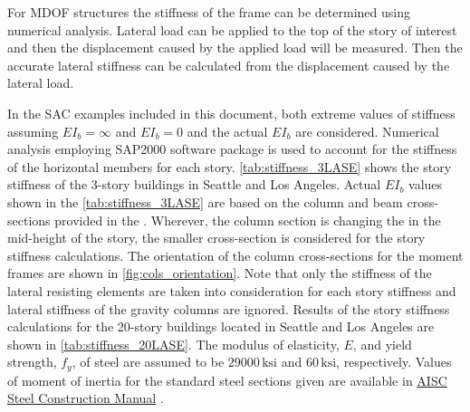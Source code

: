 \documentclass{simcenterdocumentation}
\newcommand{\ksi}{\ensuremath{\,\mathrm{ksi}}}
\begin{document}
For MDOF structures the stiffness of the frame can be determined using numerical analysis. Lateral load can be applied to the top of the story of interest and then the displacement caused by the applied load will be measured. Then the accurate lateral stiffness can be calculated from the displacement caused by the lateral load. 

In the SAC examples included in this document, both extreme values of stiffness assuming $EI_b = \infty$ and $EI_b = 0$ and the actual $EI_b$ are considered. Numerical analysis employing SAP2000 \cite{sap2000} software package is used to account for the stiffness of the horizontal members for each story. \cref{tab:stiffness_3LASE} shows the story stiffness of the 3-story buildings in Seattle and Los Angeles. Actual $EI_b$ values shown in the \cref{tab:stiffness_3LASE} are based on the column and beam cross-sections provided in the \cite{FEMA335c2000}. Wherever, the column section is changing the in the mid-height of the story, the smaller cross-section is considered for the story stiffness calculations. The orientation of the column cross-sections for the moment frames are shown in \cref{fig:cols_orientation}. Note that only the stiffness of the lateral resisting elements are taken into consideration for each story stiffness and lateral stiffness of the gravity columns are ignored. Results of the story stiffness calculations for the 20-story buildings located in Seattle and Los Angeles are shown in \cref{tab:stiffness_20LASE}. The modulus of elasticity, $E$, and yield strength, $f_y$, of steel are assumed to be $29000 \ksi$ and $60 \ksi$, respectively. Values of moment of inertia for the standard steel sections given are available in \href{https://www.aisc.org/publications/steel-construction-manual-resources/}{AISC Steel Construction Manual} \cite{aiscManual}.
\end{document}
